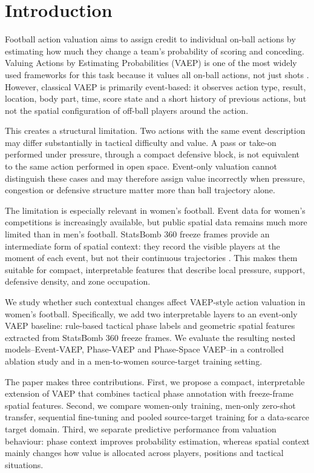 \documentclass[runningheads]{llncs}
\begin{document}
\section{Introduction}

Football action valuation aims to assign credit to individual on-ball actions by estimating how much they change a team's probability of scoring and conceding. Valuing Actions by Estimating Probabilities (VAEP) is one of the most widely used frameworks for this task because it values all on-ball actions, not just shots \cite{decroos2019actions}. However, classical VAEP is primarily event-based: it observes action type, result, location, body part, time, score state and a short history of previous actions, but not the spatial configuration of off-ball players around the action.

This creates a structural limitation. Two actions with the same event description may differ substantially in tactical difficulty and value. A pass or take-on performed under pressure, through a compact defensive block, is not equivalent to the same action performed in open space. Event-only valuation cannot distinguish these cases and may therefore assign value incorrectly when pressure, congestion or defensive structure matter more than ball trajectory alone.

The limitation is especially relevant in women's football. Event data for women's competitions is increasingly available, but public spatial data remains much more limited than in men's football. StatsBomb 360 freeze frames provide an intermediate form of spatial context: they record the visible players at the moment of each event, but not their continuous trajectories \cite{statsbomb2021freezeframe}. This makes them suitable for compact, interpretable features that describe local pressure, support, defensive density, and zone occupation.

We study whether such contextual changes affect VAEP-style action valuation in women's football. Specifically, we add two interpretable layers to an event-only VAEP baseline: rule-based tactical phase labels and geometric spatial features extracted from StatsBomb 360 freeze frames. We evaluate the resulting nested models--Event-VAEP, Phase-VAEP and Phase-Space VAEP--in a controlled ablation study and in a men-to-women source-target training setting.

The paper makes three contributions. First, we propose a compact, interpretable extension of VAEP that combines tactical phase annotation with freeze-frame spatial features. Second, we compare women-only training, men-only zero-shot transfer, sequential fine-tuning and pooled source-target training for a data-scarce target domain. Third, we separate predictive performance from valuation behaviour: phase context improves probability estimation, whereas spatial context mainly changes how value is allocated across players, positions and tactical situations.
\end{document}
